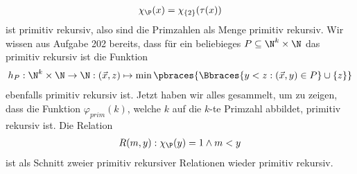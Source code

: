 \begin{solution}
\begin{enumerate}[label = (\alph*)]
\begin{enumerate}
\begin{align*}
					\chi_\P(x) = \chi_{\{2\}}(\tau(x))
				\end{align*}
				ist primitiv rekursiv, also sind die Primzahlen als Menge primitiv rekursiv. \newline 
				Wir wissen aus Aufgabe 202 bereits, dass für ein beliebieges $P \subseteq \N^k \times \N$ das primitiv rekursiv ist die Funktion 
				\begin{align*}
				h_P: \N^k \times \N \to \N: (\vec{x}, z) \mapsto \min\pbraces{\Bbraces{y < z: (\vec{x}, y) \in P} \cup \{z\}}
				\end{align*}
				ebenfalls primitiv rekursiv ist.
%
%
				\newline
				Jetzt haben wir alles gesammelt, um zu zeigen, dass die Funktion
				$\varphi_{prim}(k)$, welche $k$ auf die $k$-te Primzahl abbildet,
				primitiv rekursiv ist. Die Relation
				\begin{align*}
					R(m,y):  \chi_\P(y) = 1 \land m < y
				\end{align*}
				ist als Schnitt zweier primitiv rekursiver Relationen wieder primitiv rekursiv.

\end{enumerate}
\end{enumerate}
\end{solution}
